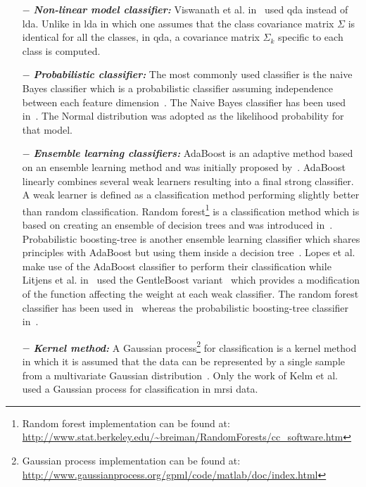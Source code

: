 \begin{enumerate}[leftmargin=*]
\item[$-$] \textbf{\textit{Non-linear model classifier:}} Viswanath et al. in~\cite{Viswanath2012} used \acf{qda} instead of \ac{lda}. Unlike in \ac{lda} in which one assumes that the class covariance matrix $\Sigma$ is identical for all the classes, in \ac{qda}, a covariance matrix $\Sigma_k$ specific to each class is computed.

\item[$-$] \textbf{\textit{Probabilistic classifier:}} The most commonly used classifier is the naive Bayes classifier which is a probabilistic classifier assuming independence between each feature dimension~\cite{Rish2001}. The Naive Bayes classifier has been used in~\cite{Giannini2013,Mazzetti2011,Niaf2011,Niaf2012}. The Normal distribution was adopted as the likelihood probability for that model.

\item[$-$] \textbf{\textit{Ensemble learning classifiers:}} AdaBoost is an adaptive method based on an ensemble learning method and was initially proposed by~\cite{Freund1997}. AdaBoost linearly combines several weak learners resulting into a final strong classifier. A weak learner is defined as a classification method performing slightly better than random classification. Random forest\footnote{Random forest implementation can be found at: \url{http://www.stat.berkeley.edu/~breiman/RandomForests/cc\_software.htm}} is a classification method which is based on creating an ensemble of decision trees and was introduced in~\cite{Breiman2001}. Probabilistic boosting-tree is another ensemble learning classifier which shares principles with AdaBoost but using them inside a decision tree~\cite{Tu2005}. 
Lopes et al.~\cite{Lopes2011} make use of the AdaBoost classifier to perform their classification while Litjens et al. in~\cite{Litjens2014} used the GentleBoost variant~\cite{Friedman1998} which provides a modification of the function affecting the weight at each weak classifier. The random forest classifier has been used in~\cite{Kelm2007,Litjens2014,Tiwari2012,Tiwari2013,Viswanath2009} whereas the probabilistic boosting-tree classifier in~\cite{Tiwari2009a,Tiwari2012,Tiwari2010,Viswanath2011}.

\item[$-$] \textbf{\textit{Kernel method:}} A Gaussian process\footnote{Gaussian process implementation can be found at: \url{http://www.gaussianprocess.org/gpml/code/matlab/doc/index.html}} for classification is a kernel method in which it is assumed that the data can be represented by a single sample from a multivariate Gaussian distribution~\cite{Rasmussen2005}. Only the work of Kelm et al.~\cite{Kelm2007} used a Gaussian process for classification in \ac{mrsi} data.


\end{enumerate}
